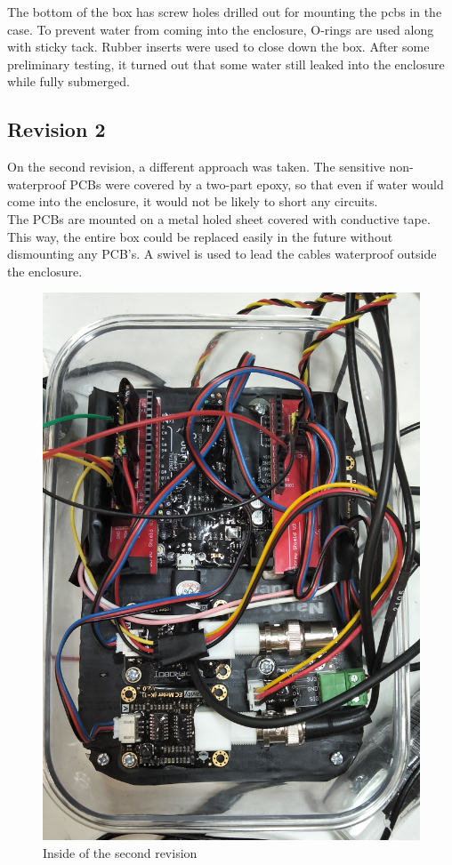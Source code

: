 The bottom of the box has screw holes drilled out for mounting the pcbs in the case. To prevent water from coming into the enclosure, O-rings are used along with sticky tack. Rubber inserts were used to close down the box. After some preliminary testing, it turned out that some water still leaked into the enclosure while fully submerged.
\newpage
\subsection{Revision 2}
On the second revision, a different approach was taken. The sensitive non-waterproof PCBs were covered by a two-part epoxy, so that even if water would come into the enclosure, it would not be likely to short any circuits.\\

The PCBs are mounted on a metal holed sheet covered with conductive tape. This way, the entire box could be replaced easily in the future without dismounting any PCB's. A swivel is used to lead the cables waterproof outside the enclosure.

\begin{figure}[h]
\centering
\includegraphics[scale=0.4]{52_rev2.jpg}
\caption{Inside of the second revision}
\end{figure}

